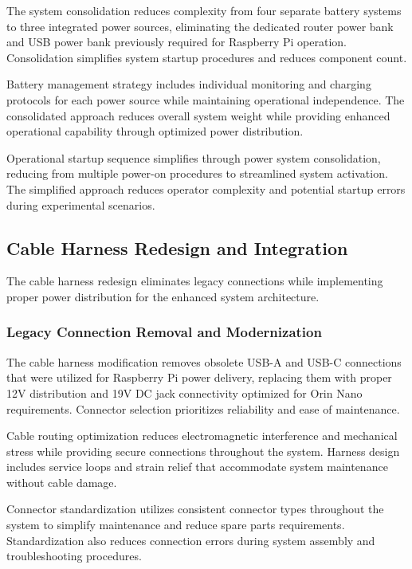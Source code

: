 The system consolidation reduces complexity from four separate battery systems to three integrated power sources, eliminating the dedicated router power bank and USB power bank previously required for Raspberry Pi operation. Consolidation simplifies system startup procedures and reduces component count.

Battery management strategy includes individual monitoring and charging protocols for each power source while maintaining operational independence. The consolidated approach reduces overall system weight while providing enhanced operational capability through optimized power distribution.

Operational startup sequence simplifies through power system consolidation, reducing from multiple power-on procedures to streamlined system activation. The simplified approach reduces operator complexity and potential startup errors during experimental scenarios.

\subsection{Cable Harness Redesign and Integration}

The cable harness redesign eliminates legacy connections while implementing proper power distribution for the enhanced system architecture.

\subsubsection{Legacy Connection Removal and Modernization}

The cable harness modification removes obsolete USB-A and USB-C connections that were utilized for Raspberry Pi power delivery, replacing them with proper 12V distribution and 19V DC jack connectivity optimized for Orin Nano requirements. Connector selection prioritizes reliability and ease of maintenance.

Cable routing optimization reduces electromagnetic interference and mechanical stress while providing secure connections throughout the system. Harness design includes service loops and strain relief that accommodate system maintenance without cable damage.

Connector standardization utilizes consistent connector types throughout the system to simplify maintenance and reduce spare parts requirements. Standardization also reduces connection errors during system assembly and troubleshooting procedures.

